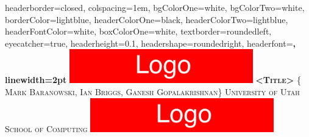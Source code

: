 \documentclass[landscape,a0paper,fontscale=0.285]{baposter} %
\begin{document}
\begin{poster}
{
headerborder=closed, %
colspacing=1em, %
bgColorOne=white, %
bgColorTwo=white, %
borderColor=lightblue, %
headerColorOne=black, %
headerColorTwo=lightblue, %
headerFontColor=white, %
boxColorOne=white, %
textborder=roundedleft, %
eyecatcher=true, %
headerheight=0.1\textheight, %
headershape=roundedright, %
headerfont=\Large\bf\textsc, %
linewidth=2pt %
}
%
{\includegraphics[height=4em]{logo.png}} %
{\bf\textsc{<Title>}\vspace{0.5em}} %
{\textsc{\{ Mark Baranowski, Ian Briggs, Ganesh Gopalakrishnan\} \hspace{12pt} University of Utah School of Computing}} %
{\includegraphics[height=4em]{logo.png}} %




\end{poster}
\end{document}
